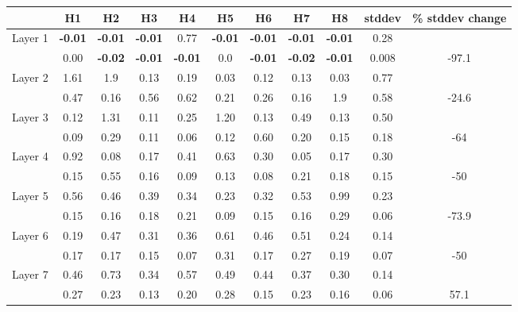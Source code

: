\documentclass[11pt]{article}
\begin{document}
\begin{table*}
\centering
\begin{tabular}{c|cccccccccc}
\hline
 & \textbf{H1} & \textbf{H2} & \textbf{H3} & \textbf{H4} & \textbf{H5} & \textbf{H6} & \textbf{H7} & \textbf{H8}  & \textbf{stddev} & \textbf{\% stddev change} \\
\hline
Layer 1 & \textbf{-0.01} & \textbf{-0.01} & \textbf{-0.01} & 0.77  & \textbf{-0.01}  & \textbf{-0.01} & \textbf{-0.01} & \textbf{-0.01}  & 0.28 \\

& 0.00 & \textbf{-0.02} & \textbf{-0.01} & \textbf{-0.01}  & 0.0  & \textbf{-0.01} & \textbf{-0.02} & \textbf{-0.01}  & 0.008 & -97.1 \\

\hline

 Layer 2 & 1.61 & 1.9 & 0.13 & 0.19 & 0.03 & 0.12 & 0.13 & 0.03 & 0.77 \\
  & 0.47 & 0.16 & 0.56 & 0.62 & 0.21 & 0.26 & 0.16 & 1.9 & 0.58  & -24.6 \\
 \hline
 
Layer 3 & 0.12 & 1.31 & 0.11 & 0.25 & 1.20 &  0.13 & 0.49 & 0.13  & 0.50  \\

 & 0.09 & 0.29 & 0.11 & 0.06 & 0.12 & 0.60 & 0.20 & 0.15 & 0.18 & -64 \\
\hline
Layer 4 & 0.92 & 0.08 & 0.17 & 0.41 & 0.63 & 0.30 & 0.05 & 0.17 &0.30   \\

 & 0.15 & 0.55 & 0.16 & 0.09 & 0.13 & 0.08 & 0.21 & 0.18  & 0.15 & -50\\
 \hline
 
 Layer 5 & 0.56 & 0.46 & 0.39 & 0.34 & 0.23 & 0.32 & 0.53 & 0.99 & 0.23 \\
 
  & 0.15 & 0.16 & 0.18 & 0.21 & 0.09 & 0.15 &  0.16 & 0.29 & 0.06 & -73.9\\
\hline

Layer 6 & 0.19 & 0.47 & 0.31 & 0.36 & 0.61 & 0.46 & 0.51 & 0.24 &  0.14 \\
 & 0.17 & 0.17 & 0.15 & 0.07 & 0.31 & 0.17 & 0.27 & 0.19 & 0.07 & -50 \\
\hline

Layer 7 &  0.46 & 0.73 & 0.34 & 0.57  & 0.49 & 0.44 & 0.37 & 0.30  &  0.14 \\
 & 0.27 & 0.23 & 0.13 & 0.20 & 0.28 & 0.15 & 0.23 & 0.16 &  0.06 & 57.1 \\
\hline


\end{tabular}
\end{table*}
\end{document}
